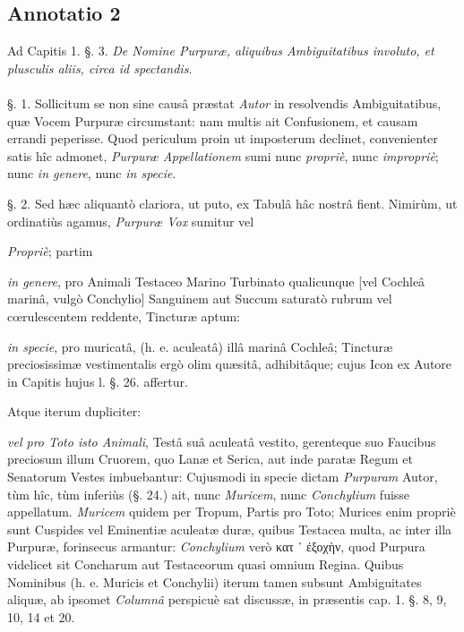 \documentclass[a4paper, 11pt, oneside, polutonikogreek, german]{article}
\begin{document}
\subsection{Annotatio 2}
\begin{center}
Ad Capitis 1. §. 3. \emph{De Nomine Purpuræ, aliquibus Ambiguitatibus involuto, et plusculis aliis, circa id spectandis}.
\end{center}
\paragraph{}
§. 1. Sollicitum se non sine causâ præstat \emph{Autor} in resolvendis Ambiguitatibus, quæ Vocem Purpuræ circumstant: nam multis ait Confusionem, et causam errandi peperisse. Quod periculum proin ut imposterum declinet, convenienter satis hîc admonet, \emph{Purpuræ Appellationem} sumi nunc \emph{propriè}, nunc \emph{impropriè}; nunc \emph{in genere}, nunc \emph{in specie}.

§. 2. Sed hæc aliquantò clariora, ut puto, ex Tabulâ hâc nostrâ fient. Nimirùm, ut ordinatiùs agamus, \emph{Purpuræ Vox} sumitur vel

\emph{Propriè}; partim

\emph{in genere}, pro Animali Testaceo Marino Turbinato qualicunque [vel Cochleâ marinâ, vulgò Conchylio] Sanguinem aut Succum saturatò rubrum vel cœrulescentem reddente, Tincturæ aptum:

\emph{in specie}, pro muricatâ, (h. e. aculeatâ) illâ marinâ Cochleâ; Tincturæ preciosissimæ vestimentalis ergò olim quæsitâ, adhibitâque; cujus Icon ex Autore in Capitis hujus l. §. 26. affertur.

Atque iterum dupliciter:

\emph{vel pro Toto isto Animali}, Testâ suâ aculeatâ vestito, gerenteque suo Faucibus preciosum illum Cruorem, quo Lanæ et Serica, aut inde paratæ Regum et Senatorum Vestes imbuebantur: Cujusmodi in specie dictam \emph{Purpuram} Autor, tùm hîc, tùm inferiùs (§. 24.) ait, nunc \emph{Muricem}, nunc \emph{Conchylium} fuisse appellatum. \emph{Muricem} quidem per Tropum, Partis pro Toto; Murices enim propriè sunt Cuspides vel Eminentiæ aculeatæ duræ, quibus Testacea multa, ac inter illa Purpuræ, forinsecus armantur: \emph{Conchylium} verò κατ ᾽ ἐξοχὴν, quod Purpura videlicet sit Concharum aut Testaceorum quasi omnium Regina. Quibus Nominibus (h. e. Muricis et Conchylii) iterum tamen subsunt Ambiguitates aliquæ, ab ipsomet \emph{Columnâ} perspicuè sat discussæ, in præsentis cap. 1. §. 8, 9, 10, 14 et 20.
\end{document}
